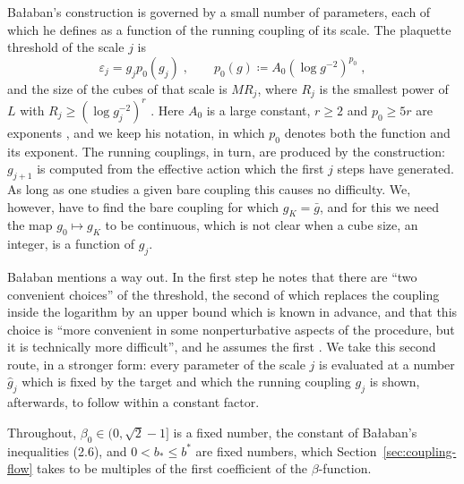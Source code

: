 \documentclass[11pt]{preprint}
\numberwithin{equation}{section}
\theoremstyle{definition}
\theoremstyle{remark}
\theoremstyle{plain}
\begin{document}
Ba{\l}aban's construction is governed by a small number of parameters, each of which he defines as a function of the running coupling of its scale. The plaquette threshold of the scale $j$ is
\begin{equation}\label{eq:balaban-threshold}
    \varepsilon_j = g_jp_0(g_j)\;,
    \qquad
    p_0(g) \coloneqq A_0(\log g^{-2})^{p_0}\;,
\end{equation}
and the size of the cubes of that scale is $MR_j$, where $R_j$ is the smallest power of $L$ with $R_j \geq (\log g_j^{-2})^r$ \cite[(2.4), (2.5), p.~255]{BalabanCRE}. Here $A_0$ is a large constant, $r \geq 2$ and $p_0 \geq 5r$ are exponents \cite[pp.~245--246]{BalabanCRE}, and we keep his notation, in which $p_0$ denotes both the function and its exponent. The running couplings, in turn, are produced by the construction: $g_{j+1}$ is computed from the effective action which the first $j$ steps have generated. As long as one studies a given bare coupling this causes no difficulty. We, however, have to find the bare coupling for which $g_K = \bar g$, and for this we need the map $g_0 \mapsto g_K$ to be continuous, which is not clear when a cube size, an integer, is a function of $g_j$.

Ba{\l}aban mentions a way out. In the first step he notes that there are ``two convenient choices'' of the threshold, the second of which replaces the coupling inside the logarithm by an upper bound which is known in advance, and that this choice is ``more convenient in some nonperturbative aspects of the procedure, but it is technically more difficult'', and he assumes the first \cite[p.~246]{BalabanCRE}. We take this second route, in a stronger form: every parameter of the scale $j$ is evaluated at a number $\hat g_j$ which is fixed by the target and which the running coupling $g_j$ is shown, afterwards, to follow within a constant factor.

Throughout, $\beta_0 \in (0, \sqrt2 - 1]$ is a fixed number, the constant of Ba{\l}aban's inequalities (2.6), and $0 < b_* \leq b^*$ are fixed numbers, which Section~\ref{sec:coupling-flow} takes to be multiples of the first coefficient of the $\beta$-function.
\end{document}
